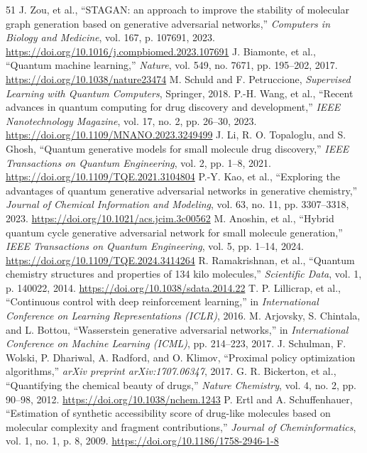 \documentclass[10pt,a4paper]{article}
\begin{document}
\begin{thebibliography}{51}
 J. Zou, et al., ``STAGAN: an approach to improve the stability of molecular graph generation based on generative adversarial networks,'' \textit{Computers in Biology and Medicine}, vol. 167, p. 107691, 2023. \url{https://doi.org/10.1016/j.compbiomed.2023.107691}
 J. Biamonte, et al., ``Quantum machine learning,'' \textit{Nature}, vol. 549, no. 7671, pp. 195--202, 2017. \url{https://doi.org/10.1038/nature23474}
 M. Schuld and F. Petruccione, \textit{Supervised Learning with Quantum Computers}, Springer, 2018.
 P.-H. Wang, et al., ``Recent advances in quantum computing for drug discovery and development,'' \textit{IEEE Nanotechnology Magazine}, vol. 17, no. 2, pp. 26--30, 2023. \url{https://doi.org/10.1109/MNANO.2023.3249499}
 J. Li, R. O. Topaloglu, and S. Ghosh, ``Quantum generative models for small molecule drug discovery,'' \textit{IEEE Transactions on Quantum Engineering}, vol. 2, pp. 1--8, 2021. \url{https://doi.org/10.1109/TQE.2021.3104804}
 P.-Y. Kao, et al., ``Exploring the advantages of quantum generative adversarial networks in generative chemistry,'' \textit{Journal of Chemical Information and Modeling}, vol. 63, no. 11, pp. 3307--3318, 2023. \url{https://doi.org/10.1021/acs.jcim.3c00562}
 M. Anoshin, et al., ``Hybrid quantum cycle generative adversarial network for small molecule generation,'' \textit{IEEE Transactions on Quantum Engineering}, vol. 5, pp. 1--14, 2024. \url{https://doi.org/10.1109/TQE.2024.3414264}
 R. Ramakrishnan, et al., ``Quantum chemistry structures and properties of 134 kilo molecules,'' \textit{Scientific Data}, vol. 1, p. 140022, 2014. \url{https://doi.org/10.1038/sdata.2014.22}
 T. P. Lillicrap, et al., ``Continuous control with deep reinforcement learning,'' in \textit{International Conference on Learning Representations (ICLR)}, 2016.
 M. Arjovsky, S. Chintala, and L. Bottou, ``Wasserstein generative adversarial networks,'' in \textit{International Conference on Machine Learning (ICML)}, pp. 214--223, 2017.
 J. Schulman, F. Wolski, P. Dhariwal, A. Radford, and O. Klimov, ``Proximal policy optimization algorithms,'' \textit{arXiv preprint arXiv:1707.06347}, 2017.
 G. R. Bickerton, et al., ``Quantifying the chemical beauty of drugs,'' \textit{Nature Chemistry}, vol. 4, no. 2, pp. 90--98, 2012. \url{https://doi.org/10.1038/nchem.1243}
 P. Ertl and A. Schuffenhauer, ``Estimation of synthetic accessibility score of drug-like molecules based on molecular complexity and fragment contributions,'' \textit{Journal of Cheminformatics}, vol. 1, no. 1, p. 8, 2009. \url{https://doi.org/10.1186/1758-2946-1-8}

\end{thebibliography}
\end{document}
